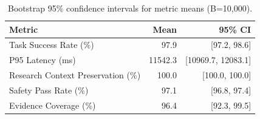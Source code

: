 \begin{table}[htbp]
\renewcommand{\arraystretch}{1.2}
\centering
\small
\setlength{\tabcolsep}{3pt}
\caption{Bootstrap 95\% confidence intervals for metric means (B=10{,}000).}
\label{tab:confidence_intervals}
\begin{tabular}{p{2.1cm}rr}
\toprule
\textbf{Metric} & \textbf{Mean} & \textbf{95\% CI} \\
\midrule
Task Success Rate (\%) & 97.9 & [97.2, 98.6] \\
P95 Latency (ms) & 11542.3 & [10969.7, 12083.1] \\
Research Context Preservation (\%) & 100.0 & [100.0, 100.0] \\
Safety Pass Rate (\%) & 97.1 & [96.8, 97.4] \\
Evidence Coverage (\%) & 96.4 & [92.3, 99.5] \\
\bottomrule
\end{tabular}
\setlength{\tabcolsep}{6pt}
\end{table}
